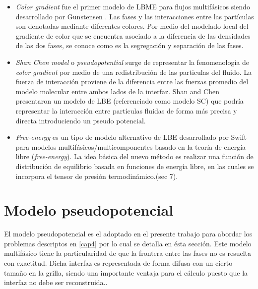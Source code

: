 \begin{itemize}
	
	\item \textit{Color gradient} fue el primer modelo de LBME para flujos multifásicos siendo desarrollado por Gunstensen \cite{gunstensen1991lattice}. Las fases y las interacciones entre las partículas son denotadas mediante diferentes colores. Por medio del modelado local del gradiente de color que se encuentra asociado a la diferencia de las densidades de las dos fases, se conoce como es la segregación y separación de las fases.
	
	\item \textit{Shan Chen model} o \textit{pseudopotential} surge de representar la fenomenología de \textit{color gradient} por medio de una redistribución de las particulas del fluido. La fuerza de interacción proviene de la diferencia entre las fuerzas promedio del modelo molecular  entre ambos lados de la interfaz. Shan and Chen \cite{shan1993lattice} presentaron un modelo de LBE (referenciado como modelo SC) que podría representar la interacción entre partículas fluidas de forma más precisa y directa introduciendo un pseudo potencial. 
	
	\item \textit{Free-energy} es un tipo de modelo alternativo de LBE desarrollado por Swift \cite{swift1995lattice} para modelos multifásicos/multicomponentes basado en la teoría de energía libre (\textit{free-energy}). La idea básica del nuevo método es realizar una función de distribución de equilibrio basada en funciones de energía libre, en las cuales se incorpora el tensor de presión termodinámico.\cite{guo2013lattice}(sec 7).
	

	
\end{itemize}




\section{Modelo pseudopotencial}

El modelo pseudopotencial es el adoptado en el presente trabajo para abordar los problemas descriptos en \ref{cap4} por lo cual se detalla en ésta sección. Este modelo multifásico tiene la particularidad de que la frontera entre las fases no es resuelta con exactitud. Dicha interfaz es representada de forma difusa con un cierto tamaño en la grilla, siendo una importante ventaja para el cálculo puesto que la interfaz no debe ser reconstruida.\cite{parrill2019reviews}.


